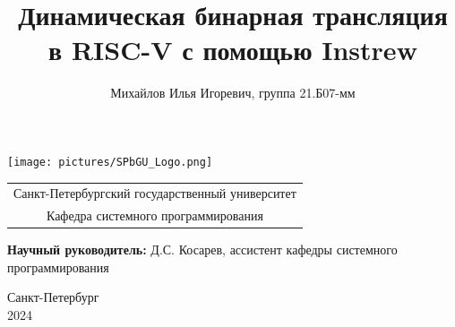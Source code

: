 \documentclass{beamer}
\title[RISC-V Instrew]{Динамическая бинарная трансляция в RISC-V с помощью Instrew}
\institute[СПбГУ]{}
\author[Михайлов Илья]{Михайлов Илья Игоревич, группа 21.Б07-мм}
\begin{document}
{
\begin{frame}
  \texttt{[image: pictures/SPbGU\_Logo.png]}
  \vspace{-35pt}
  \hspace{-10pt}
  \begin{center}
    \begin{tabular}{c}
      \scriptsize{Санкт-Петербургский государственный университет} \\
      \scriptsize{Кафедра системного программирования}
    \end{tabular}
    \titlepage
  \end{center}

  \btVFill

  {\scriptsize
    \textbf{Научный руководитель:} Д.С. Косарев, ассистент кафедры системного программирования \\
  }
  \begin{center}
    \vspace{5pt}
    \scriptsize{Санкт-Петербург\\
      2024}
  \end{center}

\end{frame}
}

\end{document}
